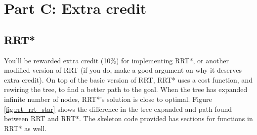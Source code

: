 \documentclass[letta4 paper]{article}
\numberwithin{equation}{section}
\newcommand{\0}{\mathbf{0}}
\begin{document}
	\section{Part C: Extra credit}
	\subsection{RRT*}
	You'll be rewarded extra credit (10\%) for implementing RRT*, or another modified version of RRT (if you do, make a good argument on why it deserves extra credit). On top of the basic version of RRT, RRT* uses a cost function, and rewiring the tree, to find a better path to the goal. When the tree has expanded infinite number of nodes, RRT*'s solution is close to optimal. Figure \ref{fig:rrt_rrt_star} shows the difference in the tree expanded and path found between RRT and RRT*. The skeleton code provided has sections for functions in RRT* as well.
\end{document}
